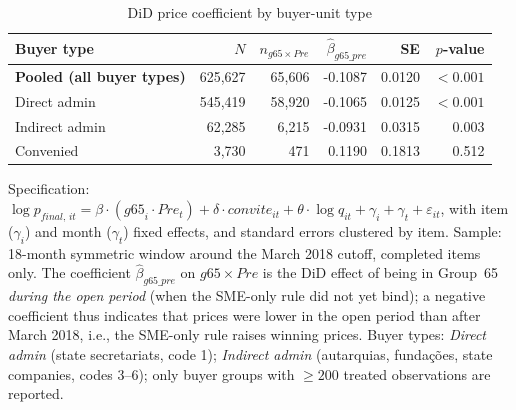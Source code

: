 \begin{table}[!htbp]
\centering
\small
\caption{DiD price coefficient by buyer-unit type}
\label{tab:v3_buyer_het}
\begin{threeparttable}
\begin{tabular}{lrrrrr}
\toprule
Buyer type & $N$ & $n_{g65 \times Pre}$ & $\hat\beta_{g65\_pre}$ & SE & $p$-value \\
\midrule
\textbf{Pooled (all buyer types)} & 625,627 & 65,606 & -0.1087 & 0.0120 & $<0.001$ \\
\midrule
\quad Direct admin & 545,419 & 58,920 & -0.1065 & 0.0125 & $<0.001$ \\
\quad Indirect admin & 62,285 & 6,215 & -0.0931 & 0.0315 & 0.003 \\
\quad Convenied & 3,730 & 471 & 0.1190 & 0.1813 & 0.512 \\
\bottomrule
\end{tabular}
\begin{tablenotes}\footnotesize
\item Specification: $\log p_{\mathit{final},\,it} = \beta \cdot
(\mathit{g65}_i \cdot \mathit{Pre}_t) + \delta \cdot \mathit{convite}_{it}
+ \theta \cdot \log q_{it} + \gamma_i + \gamma_t + \varepsilon_{it}$,
with item ($\gamma_i$) and month ($\gamma_t$) fixed effects, and
standard errors clustered by item. Sample: 18-month symmetric
window around the March 2018 cutoff, completed items only. The
coefficient $\hat\beta_{g65\_pre}$ on $g65 \times Pre$ is the
DiD effect of being in Group~65 \emph{during the open period}
(when the SME-only rule did not yet bind); a negative coefficient
thus indicates that prices were lower in the open period than
after March 2018, i.e., the SME-only rule raises winning prices.
Buyer types: \textit{Direct admin} (state secretariats, code 1);
\textit{Indirect admin} (autarquias, funda\c{c}\~oes, state companies,
codes 3--6); only buyer groups with $\geq 200$ treated observations
are reported.
\end{tablenotes}
\end{threeparttable}
\end{table}
